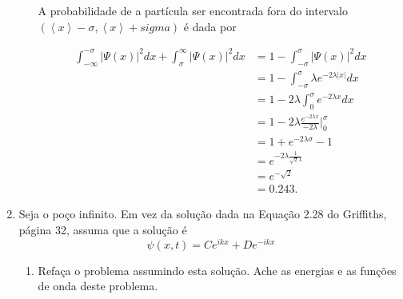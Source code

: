 \documentclass[a4paper, 12pt, notitlepage]{article}
\begin{document}
\begin{enumerate}
\begin{enumerate}
  A probabilidade de a partícula ser encontrada fora do intervalo $\left(\left\langle x \right\rangle - \sigma, \left\langle x \right\rangle + sigma\right)$ é dada por
  
  \begin{align*}
  \int_{-\infty}^{-\sigma} |\Psi(x)|^2dx + \int^{\infty}_{\sigma} |\Psi(x)|^2dx &= 1 - \int_{-\sigma}^{\sigma} |\Psi(x)|^2 dx \\
  &= 1 - \int_{-\sigma}^{\sigma} \lambda e^{-2\lambda |x|} dx \\
  &= 1 - 2\lambda\int_0^{\sigma} e^{-2\lambda x} dx \\
  &= 1 - 2\lambda \frac{e^{-2\lambda x}}{-2\lambda} \Big|_0^{\sigma} \\
  &= 1 + e^{-2\lambda \sigma} - 1 \\
  &= e^{-2\lambda \frac{1}{\sqrt{2}\lambda}} \\
  &= e^{-\sqrt{2}} \\
  &= 0.243.
  \end{align*}
  
\end{enumerate}

\item Seja o poço infinito. Em vez da solução dada na Equação 2.28 do Griffiths, página 32, assuma que a solução é
\begin{equation*}
\psi(x, t) = C e^{ikx} + D e^{-ikx}
\end{equation*}

\begin{enumerate}
  \item Refaça o problema assumindo esta solução. Ache as energias e as funções de onda deste problema.
\end{enumerate}


\end{enumerate}
\end{document}
